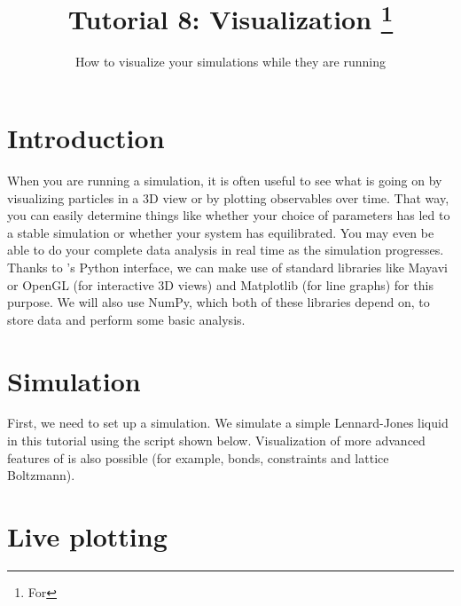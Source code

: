\documentclass[
paper=a4,                       %
fontsize=11pt,                  %
twoside,                        %
footsepline,                    %
headsepline,                    %
headinclude=false,              %
footinclude=false,              %
pagesize,                       %
]{scrartcl}
\begin{document}
\esptitlehead

\title{Tutorial 8: Visualization%
\ifdefined\esversion%
\thanks{For \es \esversion}%
\fi%
}
\subtitle{How to visualize your \es simulations while they are running}
\maketitle

\section{Introduction}
\label{intro}

When you are running a simulation, it is often useful to see what is going on by visualizing particles in a 3D view or by plotting observables over time.
That way, you can easily determine things like whether your choice of parameters has led to a stable simulation or whether your system has equilibrated.
You may even be able to do your complete data analysis in real time as the simulation progresses.\\

\noindent Thanks to \es's Python interface, we can make use of standard libraries like Mayavi or OpenGL (for interactive 3D views) and Matplotlib (for line graphs) for this purpose.
We will also use NumPy, which both of these libraries depend on, to store data and perform some basic analysis.

\section{Simulation}
\label{sim}

First, we need to set up a simulation.
We simulate a simple Lennard-Jones liquid in this tutorial using the script shown below.
Visualization of more advanced features of \es is also possible (for example, bonds, constraints and lattice Boltzmann).


\section{Live plotting}
\label{plot}
\end{document}
